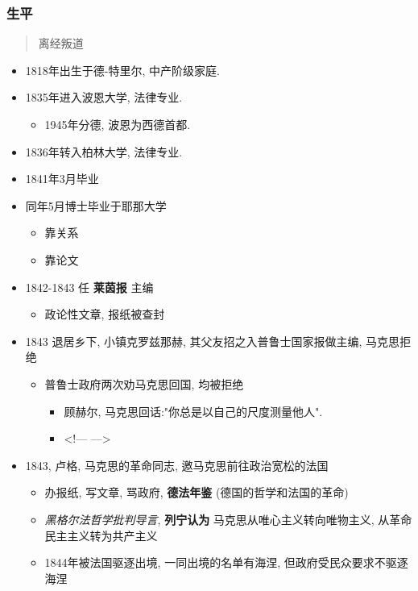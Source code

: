 \documentclass[11pt]{article}
\begin{document}
\subsubsection{生平}
\label{sec:org7ee739b}
\begin{quote}
离经叛道
\end{quote}

\begin{itemize}
\item 1818年出生于德-特里尔, 中产阶级家庭.
\item 1835年进入波恩大学, 法律专业.
\begin{itemize}
\item 1945年分德, 波恩为西德首都.
\end{itemize}
\item 1836年转入柏林大学, 法律专业.
\item 1841年3月毕业
\item 同年5月博士毕业于耶那大学
\begin{itemize}
\item 靠关系
\item 靠论文
\end{itemize}
\item 1842-1843 任 \textbf{莱茵报} 主编
\begin{itemize}
\item 政论性文章, 报纸被查封
\end{itemize}
\item 1843 退居乡下, 小镇克罗兹那赫, 其父友招之入普鲁士国家报做主编, 马克思拒绝
\begin{itemize}
\item 普鲁士政府两次劝马克思回国, 均被拒绝
\begin{itemize}
\item 顾赫尔, 马克思回话:"你总是以自己的尺度测量他人".
\item <!--- --->
\end{itemize}
\end{itemize}
\item 1843, 卢格, 马克思的革命同志, 邀马克思前往政治宽松的法国
\begin{itemize}
\item 办报纸, 写文章, 骂政府, \textbf{德法年鉴} (德国的哲学和法国的革命)
\item \emph{黑格尔法哲学批判导言}, \textbf{列宁认为} 马克思从唯心主义转向唯物主义, 从革命民主主义转为共产主义
\item 1844年被法国驱逐出境, 一同出境的名单有海涅, 但政府受民众要求不驱逐海涅
\end{itemize}

\end{itemize}
\end{document}
